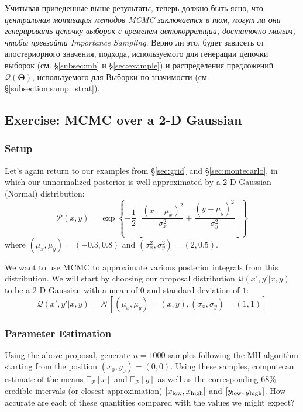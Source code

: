 \documentclass[12pt, titlepage]{article}
\newcommand{\Normal}[2]{\ensuremath{\mathcal{N}\left[{#1}, {#2} \right]}} %
\newcommand{\meanwrt}[2]{\ensuremath{\mathbb{E}_{{#2}}\left[{#1}\right]}}
\newcommand{\params}{\ensuremath{\boldsymbol\Theta}}
\newcommand{\posterior}{\ensuremath{\mathcal{P}}}
\newcommand{\proposal}{\ensuremath{\mathcal{Q}}}
\begin{document}
Учитывая приведенные выше результаты, теперь должно быть ясно, что \textit{центральная мотивация методов MCMC заключается в том, могут ли они генерировать цепочку выборок с временем автокорреляции, достаточно малым, чтобы превзойти Importance Sampling}. Верно ли это, будет зависеть от апостериорного значения, подхода, используемого для генерации цепочки выборок (см. \S\ref{subsec:mh} и \S\ref{sec:example}) и распределения предложений $\proposal(\params)$, используемого для Выборки по значимости (см. \S\ref{subsection:samp_strat}).

\subsection*{Exercise: MCMC over a 2-D Gaussian} \label{exercise:mcmc}

\subsubsection*{Setup}

Let's again return to our examples from 
\S\ref{sec:grid} and \S\ref{sec:montecarlo}, in which
our unnormalized posterior is well-approximated by a 2-D Gaussian (Normal)
distribution:
\begin{equation*}
    \tilde{\posterior}(x,y) 
    = \exp\left\{-\frac{1}{2}\left[\frac{(x-\mu_x)^2}{\sigma_x^2}
    + \frac{(y-\mu_y)^2}{\sigma_y^2}\right]\right\}
\end{equation*}
where $(\mu_x,\mu_y)=(-0.3,0.8)$ and $(\sigma_x^2,\sigma_y^2)=(2,0.5)$.

We want to use MCMC to approximate various posterior
integrals from this distribution.
We will start by choosing our proposal distribution $\proposal(x',y'|x,y)$
to be a 2-D Gaussian with a mean of $0$ and standard deviation of $1$:
\begin{equation*}
    \proposal(x',y'|x,y) = \Normal{(\mu_x,\mu_y)=(x,y)}{(\sigma_x,\sigma_y)=(1,1)}
\end{equation*}

\subsubsection*{Parameter Estimation}

Using the above proposal, generate $n=1000$ samples following the MH algorithm starting
from the position $(x_0,y_0)=(0,0)$. Using these samples,
compute an estimate of the means $\meanwrt{x}{\posterior}$
and $\meanwrt{y}{\posterior}$ as well as the corresponding 68\% credible
intervals (or closest approximation)
$[x_{\rm low}, x_{\rm high}]$ and $[y_{\rm low}, y_{\rm high}]$.
How accurate are each of these quantities compared with the values we might
expect?
\end{document}
